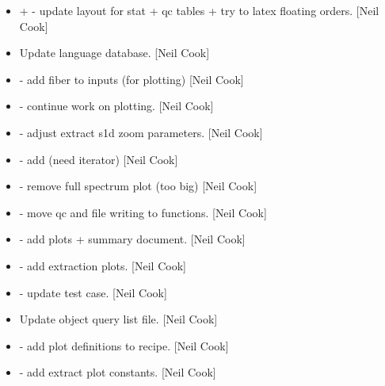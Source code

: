 \documentclass[a4paper,10pt,english]{report}
\begin{document}
\label{\detokenize{misc/changelog:id51}}\begin{itemize}
\item {} 
 +  - update layout for stat + qc tables + try
to latex floating orders. {[}Neil Cook{]}

\item {} 
Update language database. {[}Neil Cook{]}

\item {} 
 - add fiber to  inputs (for
plotting) {[}Neil Cook{]}

\item {} 
 - continue work on plotting. {[}Neil Cook{]}

\item {} 
 - adjust extract s1d zoom
parameters. {[}Neil Cook{]}

\item {} 
 - add  (need iterator)
{[}Neil Cook{]}

\item {} 
 - remove full spectrum plot (too big) {[}Neil
Cook{]}

\item {} 
 - move qc and file writing to functions.
{[}Neil Cook{]}

\item {} 
 - add plots + summary document. {[}Neil Cook{]}

\item {} 
 - add extraction plots. {[}Neil Cook{]}

\item {} 
 - update test case. {[}Neil Cook{]}

\item {} 
Update object query list file. {[}Neil Cook{]}

\item {} 
 - add plot definitions
to recipe. {[}Neil Cook{]}

\item {} 
 - add extract plot constants.
{[}Neil Cook{]}


\end{itemize}
\end{document}

